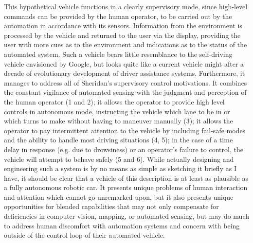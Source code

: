 This hypothetical vehicle functions in a clearly supervisory mode,
since high-level commands can be provided by the human operator, to be
carried out by the automation in accordance with its sensors.
Information from the environment is processed by the vehicle and
returned to the user via the display, providing the user with more
cues as to the environment and indications as to the status of the
automated system. Such a vehicle bears little resemblance to the
self-driving vehicle envisioned by Google, but looks quite like a
current vehicle might after a decade of evolutionary development of
driver assistance systems. Furthermore, it manages to address all of
Sheridan's supervisory control motivations. It combines the constant
vigilance of automated sensing with the judgment and perception of the
human operator (1 and 2); it allows the operator to provide high level
controls in autonomous mode, instructing the vehicle which lane to be
in or which turns to make without having to maneuver manually (3); it
allows the operator to pay intermittent attention to the vehicle by
including fail-safe modes and the ability to handle most driving
situations (4, 5); in the case of a time delay in response (e.g. due
to drowsiness) or an
operator's failure to control, the vehicle will attempt to behave
safely (5 and 6). While actually designing and engineering such a
system is by no means as simple as sketching it briefly as I have, it
should be clear that a vehicle of this description is at least as plausible as a fully
autonomous robotic car. It presents unique problems of human
interaction and attention which cannot go unremarked upon, but it also
presents unique opportunities for blended 
capabilities that may not only compensate for deficiencies in computer
vision, mapping, or automated sensing, but may do much to address
human discomfort with automation systems and concern with being
outside of the control loop of their automated vehicle.



